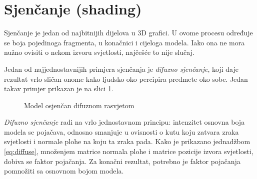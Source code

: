\section{Sjenčanje (shading)}

Sjenčanje je jedan od najbitnijih dijelova u 3D grafici. U ovome procesu određuje se boja pojedinoga fragmenta, u konačnici i cijeloga modela. Iako ona ne mora nužno ovisiti o nekom izvoru svjetlosti, najčešće to nije slučaj.

Jedan od najjednostavnijih primjera sjenčanja je \emph{difuzno sjenčanje}, koji daje rezultat vrlo sličan onome kako ljudsko oko percipira predmete oko sobe. Jedan takav primjer prikazan je na slici \ref{fig:monkey-plastic}.


\begin{figure}[H]
\label{fig:monkey-plastic}
\begin{center}
\caption{Model osjenčan difuznom rasvjetom}
\end{center}
\end{figure}

\emph{Difuzno sjenčanje} radi na vrlo jednostavnom principu: intenzitet osnovna boja modela se pojačava, odnosno smanjuje u ovisnosti o kutu koju zatvara zraka svjetlosti i normale plohe na koju ta zraka pada. Kako je prikazano jednadžbom \ref{eq:diffuse}, množenjem matrice normala plohe i matrice pozicije izvora svjetlosti, dobiva se faktor pojačanja. Za konačni rezultat, potrebno je faktor pojačanja pomnožiti sa osnovnom bojom modela.

